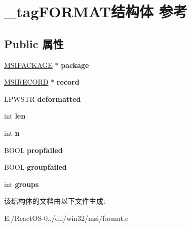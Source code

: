 \hypertarget{struct__tag_f_o_r_m_a_t}{}\section{\+\_\+tag\+F\+O\+R\+M\+A\+T结构体 参考}
\label{struct__tag_f_o_r_m_a_t}
\subsection*{Public 属性}
\begin{DoxyCompactItemize}
\item 
\mbox{\label{struct__tag_f_o_r_m_a_t_a8d7bf547c083965d1aaae29b8c6bf479}} 
\hyperlink{structtag_m_s_i_p_a_c_k_a_g_e}{M\+S\+I\+P\+A\+C\+K\+A\+GE} $\ast$ {\bfseries package}
\item 
\mbox{\label{struct__tag_f_o_r_m_a_t_ab17e68b3b684e8e5b38df7211fe05996}} 
\hyperlink{structtag_m_s_i_r_e_c_o_r_d}{M\+S\+I\+R\+E\+C\+O\+RD} $\ast$ {\bfseries record}
\item 
\mbox{\label{struct__tag_f_o_r_m_a_t_a9f79dfefd41c4fedc2c328c63167f0c7}} 
L\+P\+W\+S\+TR {\bfseries deformatted}
\item 
\mbox{\label{struct__tag_f_o_r_m_a_t_a4d1fe22b15752530b7052e8ce4a5b240}} 
int {\bfseries len}
\item 
\mbox{\label{struct__tag_f_o_r_m_a_t_ae9302ee3f973bf272dfd677b19d2c337}} 
int {\bfseries n}
\item 
\mbox{\label{struct__tag_f_o_r_m_a_t_a2dbffc5847f148fbb59b4e6c92b5cfe2}} 
B\+O\+OL {\bfseries propfailed}
\item 
\mbox{\label{struct__tag_f_o_r_m_a_t_af9cbe3b714d8d31edaf50e34ba38341c}} 
B\+O\+OL {\bfseries groupfailed}
\item 
\mbox{\label{struct__tag_f_o_r_m_a_t_ae3942401fdfe882bbee8ebce4f7a80b7}} 
int {\bfseries groups}
\end{DoxyCompactItemize}


该结构体的文档由以下文件生成\+:\begin{DoxyCompactItemize}
\item 
E\+:/\+React\+O\+S-\/0../dll/win32/msi/format.\+c\end{DoxyCompactItemize}
